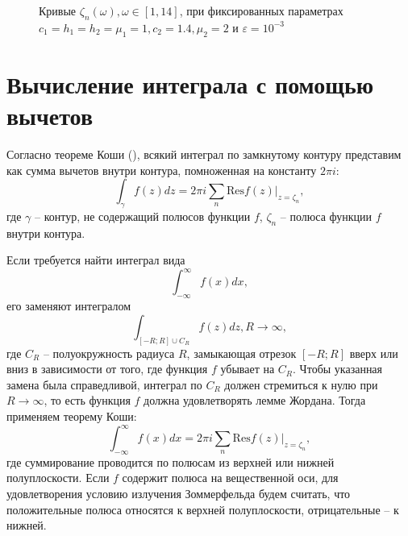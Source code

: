 \documentclass[a4paper, 12pt]{article}
\begin{document}
\begin{figure}[h!]
\noindent{}
\caption{Кривые $\zeta_n(\omega), \omega \in [1,14]$, при фиксированных параметрах $c_1=h_1=h_2=\mu_1=1,c_2=1.4,\mu_2=2$ и $\varepsilon = 10^{-3}$}
\label{figCurves} 
\end{figure}

\section{Вычисление интеграла с помощью вычетов}
Согласно теореме Коши (\cite{new,tfkp}), всякий интеграл по замкнутому контуру представим как сумма вычетов внутри контура, помноженная на константу $2\pi i$:
$$\int _{\gamma} f(z) dz = 2\pi i \sum_n \mathrm{Res} f(z)|_{z=\zeta_n},$$
где $\gamma$ -- контур, не содержащий полюсов функции $f$, $\zeta_n$ -- полюса функции $f$ внутри контура.

Если требуется найти интеграл вида $$\int^{\infty}_{-\infty} f(x) dx,$$ его заменяют интегралом $$\int_{[-R;R] \cup C_R} f(z) dz, R \rightarrow \infty,$$ где $C_R$ -- полуокружность радиуса $R$, замыкающая отрезок $[-R;R]$ вверх или вниз в зависимости от того, где функция $f$ убывает на $C_R$. Чтобы указанная замена была справедливой, интеграл по $C_R$ должен стремиться к нулю при $R \rightarrow \infty$, то есть функция $f$ должна удовлетворять лемме Жордана. Тогда применяем теорему Коши:
$$\int^{\infty}_{-\infty} f(x) dx = 2\pi i \sum_n \mathrm{Res} f(z)|_{z=\zeta_n},$$
где суммирование проводится по полюсам из верхней или нижней полуплоскости. Если $f$ содержит полюса на вещественной оси, для удовлетворения условию излучения Зоммерфельда будем считать, что положительные полюса относятся к верхней полуплоскости, отрицательные -- к нижней.
\end{document}
